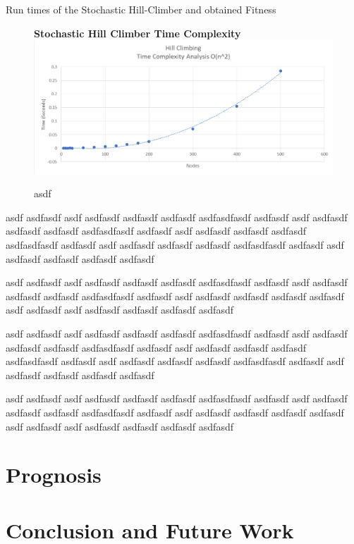 \documentclass[sigplan,screen]{acmart}
\begin{document}
\begin{table}[h]
    \setlength\tabcolsep{2pt}
    \centering
    
    \caption{Run times of the Stochastic Hill-Climber and obtained Fitness}
    \label{table:hill_climber_table}
\end{table}

\begin{figure}[h]
    \centering
    \textbf{Stochastic Hill Climber Time Complexity}
    \includegraphics[width=\columnwidth]{assets/hill_climber.png}
    \caption{asdf}
    \label{fig:hill_climber}
\end{figure}

asdf
asdfasdf
asdf
asdfasdf
asdfasdf
asdfasdf
asdfasdfasdf
asdfasdf
asdf
asdfasdf
asdfasdf
asdfasdf
asdfasdfasdf
asdfasdf
asdf
asdfasdf
asdfasdf
asdfasdf
asdfasdfasdf
asdfasdf
asdf
asdfasdf
asdfasdf
asdfasdf
asdfasdfasdf
asdfasdf
asdf
asdfasdf
asdfasdf
asdfasdf
asdfasdf

asdf
asdfasdf
asdf
asdfasdf
asdfasdf
asdfasdf
asdfasdfasdf
asdfasdf
asdf
asdfasdf
asdfasdf
asdfasdf
asdfasdfasdf
asdfasdf
asdf
asdfasdf
asdfasdf
asdfasdf
asdfasdf
asdf
asdfasdf
asdf
asdfasdf
asdfasdf
asdfasdf
asdfasdf

asdf
asdfasdf
asdf
asdfasdf
asdfasdf
asdfasdf
asdfasdfasdf
asdfasdf
asdf
asdfasdf
asdfasdf
asdfasdf
asdfasdfasdf
asdfasdf
asdf
asdfasdf
asdfasdf
asdfasdf
asdfasdfasdf
asdfasdf
asdf
asdfasdf
asdfasdf
asdfasdf
asdfasdfasdf
asdfasdf
asdf
asdfasdf
asdfasdf
asdfasdf
asdfasdf

asdf
asdfasdf
asdf
asdfasdf
asdfasdf
asdfasdf
asdfasdfasdf
asdfasdf
asdf
asdfasdf
asdfasdf
asdfasdf
asdfasdfasdf
asdfasdf
asdf
asdfasdf
asdfasdf
asdfasdf
asdfasdf
asdf
asdfasdf
asdf
asdfasdf
asdfasdf
asdfasdf
asdfasdf


\section{Prognosis}

\section{Conclusion and Future Work}




\end{document}
